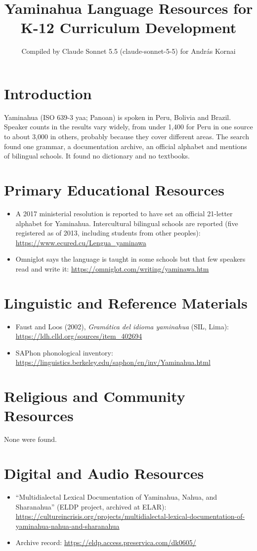 \documentclass[12pt]{article}
\title{Yaminahua Language Resources for K-12 Curriculum Development}
\author{Compiled by Claude Sonnet 5.5 (claude-sonnet-5-5) for Andr\'as Kornai}
\date{}
\begin{document}
\maketitle

\section{Introduction}
Yaminahua (ISO 639-3 yaa; Panoan) is spoken in Peru, Bolivia and Brazil. Speaker counts in the results vary widely, from under 1,400 for Peru in one source to about 3,000 in others, probably because they cover different areas. The search found one grammar, a documentation archive, an official alphabet and mentions of bilingual schools. It found no dictionary and no textbooks.

\section{Primary Educational Resources}
\begin{itemize}
\item A 2017 ministerial resolution is reported to have set an official 21-letter alphabet for Yaminahua. Intercultural bilingual schools are reported (five registered as of 2013, including students from other peoples): \url{https://www.ecured.cu/Lengua_yaminawa}
\item Omniglot says the language is taught in some schools but that few speakers read and write it: \url{https://omniglot.com/writing/yaminawa.htm}
\end{itemize}

\section{Linguistic and Reference Materials}
\begin{itemize}
\item Faust and Loos (2002), \emph{Gram\'atica del idioma yaminahua} (SIL, Lima): \url{https://ldh.clld.org/sources/item_402694}
\item SAPhon phonological inventory: \url{https://linguistics.berkeley.edu/saphon/en/inv/Yaminahua.html}
\end{itemize}

\section{Religious and Community Resources}
None were found.

\section{Digital and Audio Resources}
\begin{itemize}
\item ``Multidialectal Lexical Documentation of Yaminahua, Nahua, and Sharanahua'' (ELDP project, archived at ELAR): \url{https://cultureincrisis.org/projects/multidialectal-lexical-documentation-of-yaminahua-nahua-and-sharanahua}
\item Archive record: \url{https://eldp.access.preservica.com/dk0605/}
\end{itemize}
\end{document}
